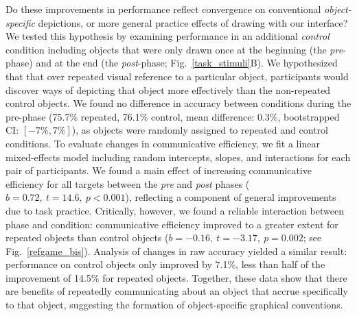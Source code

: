 \documentclass[11pt,letterpaper]{article}
\begin{document}
Do these improvements in performance reflect convergence on conventional \emph{object-specific} depictions, or more general practice effects of drawing with our interface?
We tested this hypothesis by examining performance in an additional \emph{control} condition including objects that were only drawn once at the beginning (the \emph{pre}-phase) and at the end (the \emph{post}-phase;  Fig.~\ref{task_stimuli}B).
We hypothesized that that over repeated visual reference to a particular object, participants would discover ways of depicting that object more effectively than the non-repeated control objects.
We found no difference in accuracy between conditions during the pre-phase (75.7\% repeated, 76.1\% control, mean difference: 0.3\%, bootstrapped CI: $[-7\%, 7\%]$), as objects were randomly assigned to repeated and control conditions.
To evaluate changes in communicative efficiency, we fit a linear mixed-effects model including random intercepts, slopes, and interactions for each pair of participants.
We found a main effect of increasing communicative efficiency for all targets between the \textit{pre} and \textit{post} phases ($b = 0.72,~t = 14.6,~p <0.001$), reflecting a component of general improvements due to task practice.
Critically, however, we found a reliable interaction between phase and condition: communicative efficiency improved to a greater extent for repeated objects than control objects ($b = -0.16, ~t = -3.17,~p = 0.002$; see Fig.~\ref{refgame_bis}).
Analysis of changes in raw accuracy yielded a similar result: performance on control objects only improved by 7.1\%, less than half of the improvement of 14.5\% for repeated objects.
Together, these data show that there are benefits of repeatedly communicating about an object that accrue specifically to that object, suggesting the formation of object-specific graphical conventions.
\end{document}
